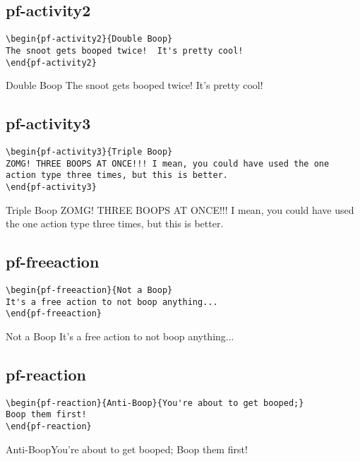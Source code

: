 \begin{multicols}{2}
\subsection{pf-activity2}
\begin{verbatim}
\begin{pf-activity2}{Double Boop}
The snoot gets booped twice!  It's pretty cool!
\end{pf-activity2}
\end{verbatim}
\begin{pf-activity2}{Double Boop}
The snoot gets booped twice!  It's pretty cool!
\end{pf-activity2}

\subsection{pf-activity3}
\begin{verbatim}
\begin{pf-activity3}{Triple Boop}
ZOMG! THREE BOOPS AT ONCE!!! I mean, you could have used the one action type three times, but this is better.
\end{pf-activity3}
\end{verbatim}
\begin{pf-activity3}{Triple Boop}
ZOMG! THREE BOOPS AT ONCE!!! I mean, you could have used the one action type three times, but this is better.
\end{pf-activity3}

\subsection{pf-freeaction}
\begin{verbatim}
\begin{pf-freeaction}{Not a Boop}
It's a free action to not boop anything...
\end{pf-freeaction}
\end{verbatim}
\begin{pf-freeaction}{Not a Boop}
It's a free action to not boop anything...
\end{pf-freeaction}

\subsection{pf-reaction}
\begin{verbatim}
\begin{pf-reaction}{Anti-Boop}{You're about to get booped;}
Boop them first!
\end{pf-reaction}
\end{verbatim}
\begin{pf-reaction}{Anti-Boop}{You're about to get booped;}
Boop them first!
\end{pf-reaction}


\end{multicols}
